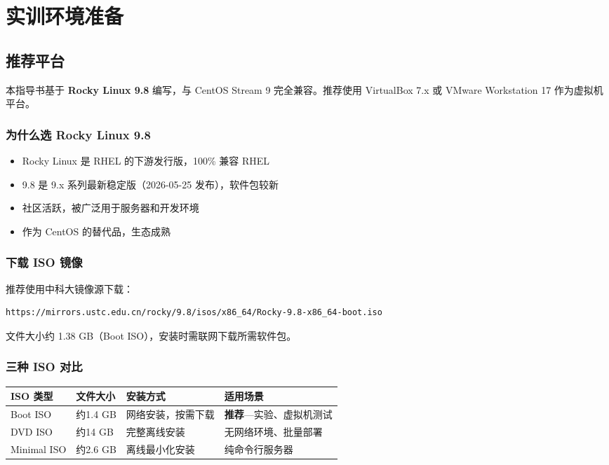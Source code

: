 \documentclass[12pt,a4paper]{ctexart}
\begin{document}
\section{实训环境准备}

\subsection{推荐平台}

\begin{infobox}
  本指导书基于 \textbf{Rocky Linux 9.8} 编写，与 CentOS Stream 9 完全兼容。推荐使用 VirtualBox 7.x 或 VMware Workstation 17 作为虚拟机平台。
\end{infobox}

\subsubsection{为什么选 Rocky Linux 9.8}

\begin{itemize}
  \item Rocky Linux 是 RHEL 的下游发行版，100\% 兼容 RHEL
  \item 9.8 是 9.x 系列最新稳定版（2026-05-25 发布），软件包较新
  \item 社区活跃，被广泛用于服务器和开发环境
  \item 作为 CentOS 的替代品，生态成熟
\end{itemize}

\subsubsection{下载 ISO 镜像}

推荐使用中科大镜像源下载：

\begin{cmdbox}
\small
\begin{lstlisting}[language=bash,numbers=none]
https://mirrors.ustc.edu.cn/rocky/9.8/isos/x86_64/Rocky-9.8-x86_64-boot.iso
\end{lstlisting}
\end{cmdbox}

文件大小约 1.38 GB（Boot ISO），安装时需联网下载所需软件包。

\subsubsection{三种 ISO 对比}

\begin{table}[h]
\centering
\begin{tabular}{p{2cm}p{2.5cm}p{3cm}p{5cm}}
\toprule
ISO 类型 & 文件大小 & 安装方式 & 适用场景 \\
\midrule
Boot ISO  & 约1.4 GB & 网络安装，按需下载 & \textbf{推荐}—实验、虚拟机测试 \\
DVD ISO   & 约14 GB  & 完整离线安装    & 无网络环境、批量部署 \\
Minimal ISO & 约2.6 GB & 离线最小化安装  & 纯命令行服务器 \\
\bottomrule
\end{tabular}
\end{table}
\end{document}
